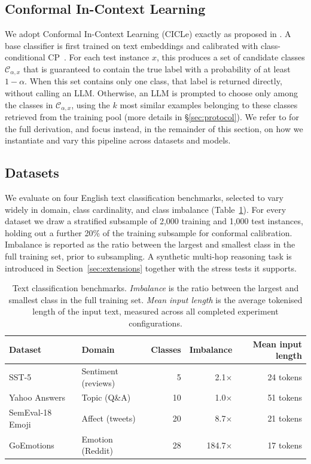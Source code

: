 \documentclass[runningheads]{llncs}
\begin{document}
\subsection{Conformal In-Context Learning}
%
We adopt Conformal In-Context Learning (CICLe) exactly as
proposed in \cite{randl2024cicle}. A base classifier is first trained on
text embeddings and calibrated with class-conditional CP~\cite{vovk2005algorithmic}. For each test instance $x$, this
produces a set of candidate classes $\mathcal{C}_{\alpha,x}$ that is guaranteed to
contain the true label with a probability of at least $1-\alpha$. When this
set contains only one class, that label is returned directly,
without calling an LLM. Otherwise, an LLM is prompted to choose only among the classes in $\mathcal{C}_{\alpha,x}$, using the $k$ most similar examples belonging to these classes retrieved from the training pool (more details in \S\ref{sec:protocol}). We refer to \cite{randl2024cicle} for the full
derivation, and focus instead, in the remainder of this section, on how
we instantiate and vary this pipeline across datasets and models.
%
\subsection{Datasets}
%
We evaluate on four English text classification benchmarks, selected to
vary widely in domain, class cardinality, and class imbalance
(Table~\ref{tab:datasets}). For every dataset we draw a stratified
subsample of 2,000 training and 1,000 test instances, holding out a
further 20\% of the training subsample for conformal calibration.
Imbalance is reported as the ratio between the largest and smallest
class in the full training set, prior to subsampling. A synthetic multi-hop reasoning task is introduced in Section~\ref{sec:extensions} together with the stress tests it supports.
%
\begin{table}
\centering
\begin{tabular}{|l|l|r|r|r|}
\hline
Dataset & Domain & Classes & Imbalance & Mean input length \\
\hline
SST-5~\cite{socher2013recursive} & Sentiment (reviews) & 5 & 2.1$\times$ & 24 tokens \\
Yahoo Answers~\cite{zhang2015character} & Topic (Q\&A) & 10 & 1.0$\times$ & 51 tokens \\
SemEval-18 Emoji~\cite{barbieri2018semeval} & Affect (tweets) & 20 & 8.7$\times$ & 21 tokens \\
GoEmotions~\cite{demszky2020goemotions} & Emotion (Reddit) & 28 & 184.7$\times$ & 17 tokens \\
\hline
\end{tabular}
\smallskip
\caption{Text classification benchmarks. \emph{Imbalance} is the ratio
between the largest and smallest class in the full training set.
\emph{Mean input length} is the average tokenised length of the input
text, measured across all completed experiment configurations.}
\label{tab:datasets}
\end{table}
%
\end{document}
